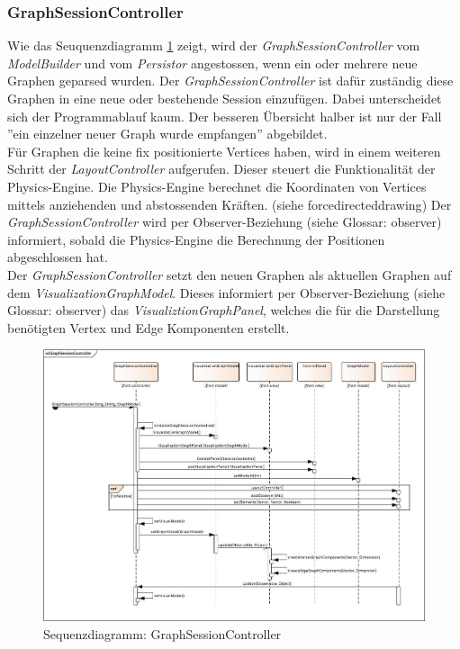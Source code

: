 \documentclass[11pt,a4paper,english,oneside]{book}
\numberwithin{equation}{chapter}
\begin{document}
	\subsubsection{GraphSessionController} \label{sssec:sessioncontroller}
	Wie das Seuquenzdiagramm \ref{fig:sd-graphsessioncontroller} zeigt, wird der \textit{GraphSessionController} vom \textit{ModelBuilder} und vom \textit{Persistor} angestossen, wenn ein oder mehrere neue Graphen geparsed wurden. Der \textit{GraphSessionController} ist dafür zuständig diese Graphen in eine neue oder bestehende Session einzufügen. Dabei unterscheidet sich der Programmablauf kaum. Der besseren Übersicht halber ist nur der Fall ''ein einzelner neuer Graph wurde empfangen'' abgebildet.\\
	Für Graphen die keine fix positionierte Vertices haben, wird in einem weiteren Schritt der \textit{LayoutController} aufgerufen. Dieser steuert die Funktionalität der Physics-Engine. Die Physics-Engine berechnet die Koordinaten von Vertices mittels anziehenden und abstossenden Kräften. (siehe \gls{forcedirecteddrawing}) Der \textit{GraphSessionController} wird  per Observer-Beziehung (siehe Glossar: \gls{observer}) informiert, sobald die Physics-Engine die Berechnung der Positionen abgeschlossen hat.\\
	Der \textit{GraphSessionController} setzt den neuen Graphen als aktuellen Graphen auf dem \textit{VisualizationGraphModel}. Dieses informiert per Observer-Beziehung (siehe Glossar: \gls{observer}) das \textit{VisualiztionGraphPanel}, welches die für die Darstellung benötigten Vertex und Edge Komponenten erstellt.
	\begin{figure}[h!]
		\centering
		\includegraphics[width=\linewidth]{assets/images/graph_session_controller}
		\caption{Sequenzdiagramm: GraphSessionController}
		\label{fig:sd-graphsessioncontroller}
	\end{figure}
	
\end{document}
